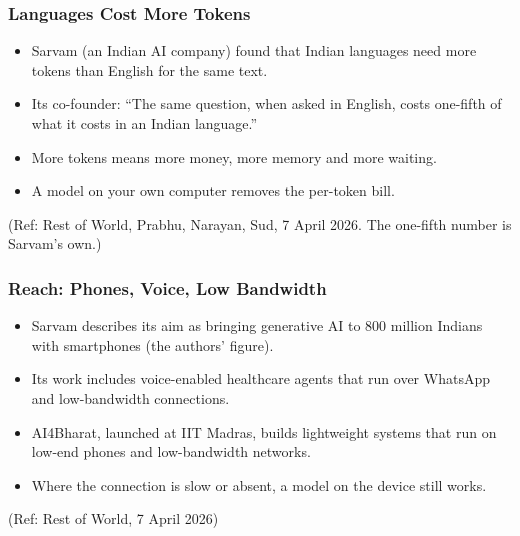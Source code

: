 \begin{frame}[fragile]\frametitle{Languages Cost More Tokens}
\begin{itemize}
\item Sarvam (an Indian AI company) found that Indian languages need more tokens than English for the same text.
\item Its co-founder: ``The same question, when asked in English, costs one-fifth of what it costs in an Indian language.''
\item More tokens means more money, more memory and more waiting.
\item A model on your own computer removes the per-token bill.
\end{itemize}
{\tiny (Ref: Rest of World, Prabhu, Narayan, Sud, 7 April 2026. The one-fifth number is Sarvam's own.)}
\end{frame}

\begin{frame}[fragile]\frametitle{Reach: Phones, Voice, Low Bandwidth}
\begin{itemize}
\item Sarvam describes its aim as bringing generative AI to 800 million Indians with smartphones (the authors' figure).
\item Its work includes voice-enabled healthcare agents that run over WhatsApp and low-bandwidth connections.
\item AI4Bharat, launched at IIT Madras, builds lightweight systems that run on low-end phones and low-bandwidth networks.
\item Where the connection is slow or absent, a model on the device still works.
\end{itemize}
{\tiny (Ref: Rest of World, 7 April 2026)}
\end{frame}


